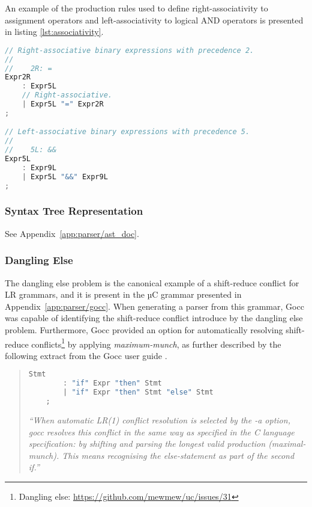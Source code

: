 An example of the production rules used to define right-associativity to assignment operators and left-associativity to logical AND operators is presented in listing \ref{lst:associativity}.

\begin{lstlisting}[language=go,style=go,caption={\label{lst:associativity}Associativity of binary expressions.}]
// Right-associative binary expressions with precedence 2.
//
//    2R: =
Expr2R
	: Expr5L
	// Right-associative.
	| Expr5L "=" Expr2R
;

// Left-associative binary expressions with precedence 5.
//
//    5L: &&
Expr5L
	: Expr9L
	| Expr5L "&&" Expr9L
;
\end{lstlisting}

\subsubsection{Syntax Tree Representation}

See Appendix~\ref{app:parser/ast_doc}.



\subsubsection{Dangling Else}

The dangling else problem is the canonical example of a shift-reduce conflict for LR grammars, and it is present in the µC grammar presented in Appendix~\ref{app:parser/gocc}. When generating a parser from this grammar, Gocc was capable of identifying the shift-reduce conflict introduce by the dangling else problem. Furthermore, Gocc provided an option for automatically resolving shift-reduce conflicts\footnote{Dangling else: \url{https://github.com/mewmew/uc/issues/31}} by applying \textit{maximum-munch}, as further described by the following extract from the Gocc user guide \cite{gocc_user_guide}.

\begin{quote}
	\begin{lstlisting}[language=go,style=go,caption={Grammar with shift-reduce conflict.}]
	Stmt
		: "if" Expr "then" Stmt
		| "if" Expr "then" Stmt "else" Stmt
	;
	\end{lstlisting}

	\textit{``When automatic LR(1) conflict resolution is selected by the -a option, gocc resolves this conflict in the same way as specified in the C language specification: by shifting and parsing the longest valid production (maximal-munch). This means recognising the else-statement as part of the second if.''}
\end{quote}
